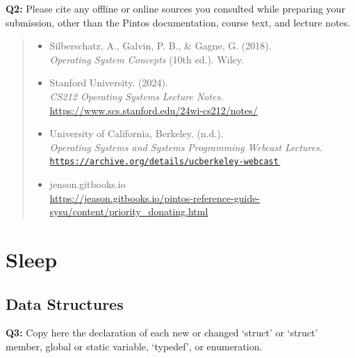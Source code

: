 \documentclass[a4paper,11pt]{paper}
\let\orighref\href
\renewcommand{\href}[2]{\orighref{#1}{#2\,\smaller[4]\faExternalLink}}
\begin{document}
\textbf{Q2:} Please cite any offline or online sources you consulted while preparing your
submission, other than the Pintos documentation, course text, and lecture notes.
\begin{quote}
  \begin{itemize}
    \item Silberschatz, A., Galvin, P. B., \& Gagne, G. (2018). \\
    \textit{Operating System Concepts} (10th ed.). Wiley.
    
    \item Stanford University. (2024). \\
    \textit{CS212 Operating Systems Lecture Notes}. \\
    \url{https://www.scs.stanford.edu/24wi-cs212/notes/}
    
    \item University of California, Berkeley. (n.d.). \\
    \textit{Operating Systems and Systems Programming Webcast Lectures}. \\
    \href{https://archive.org/details/ucberkeley-webcast-PL-XXv-cvA_iBDyz-ba4yDskqMDY6A1w_c}{%
      \nolinkurl{https://archive.org/details/ucberkeley-webcast}}

    \item jenson.gitbooks.io\\
    \url{https://jeason.gitbooks.io/pintos-reference-guide-sysu/content/priority_donating.html}
  \end{itemize}
\end{quote}


\section{Sleep}

\subsection{Data Structures}

\textbf{Q3:} Copy here the declaration of each new or changed `struct' or `struct' member, global or static variable, `typedef', or enumeration.
\end{document}
